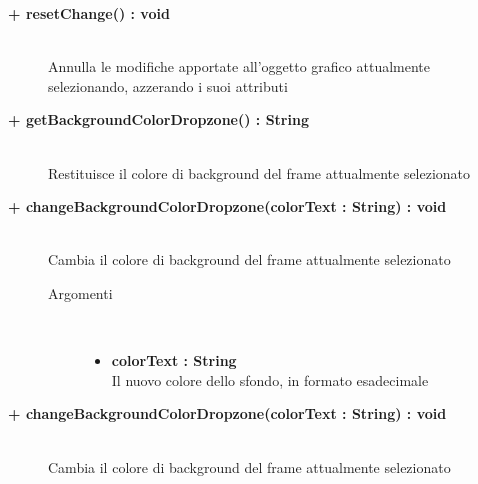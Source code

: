 \begin{description}
\begin{description}
\begin{description}
		\end{description}
	\end{description}
	
	
	\begin{description}
		\item[\textbf{\color{blue}+ resetChange() : void 	}] \hfill \\
		Annulla le modifiche apportate all'oggetto grafico attualmente selezionando, azzerando i suoi attributi

	\end{description}
	
	\begin{description}
		\item[\textbf{\color{blue}+ getBackgroundColorDropzone() : String 	}] \hfill \\
		Restituisce il colore di background del frame attualmente selezionato

	\end{description}
	
	\begin{description}
		\item[\textbf{\color{blue}+ changeBackgroundColorDropzone(colorText : String) : void	 	}] \hfill \\
		Cambia il colore di background del frame attualmente selezionato
			
		\begin{description}
			\item[Argomenti] \hfill \\
				\begin{itemize}
				
					\item \textbf{colorText : String} \hfill \\
					Il nuovo colore dello sfondo, in formato esadecimale
				\end{itemize}
				
		\end{description}
	\end{description}
	
	\begin{description}
		\item[\textbf{\color{blue}+ changeBackgroundColorDropzone(colorText : String) : void	 	}] \hfill \\
		Cambia il colore di background del frame attualmente selezionato
			

\end{description}
\end{description}
